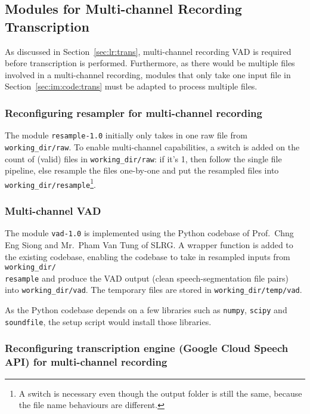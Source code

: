 \subsection{Modules for Multi-channel Recording
Transcription}\label{sec:im:code:mctr}

As discussed in Section~\ref{sec:lr:trans}, multi-channel recording VAD
is required before transcription is performed. Furthermore, as there would
be multiple files involved in a multi-channel recording, modules that only
take one input file in Section~\ref{sec:im:code:trans} must be adapted to
process multiple files.

\subsubsection{Reconfiguring resampler for multi-channel recording}

The module \texttt{resample-1.0} initially only takes in one raw file from
\texttt{working\_dir/raw}. To enable multi-channel capabilities, a switch is
added on the count of (valid) files in \texttt{working\_dir/raw}: if it's 1,
then follow the single file pipeline, else resample the files one-by-one and
put the resampled files into \texttt{working\_dir/resample}\footnote{A
switch is necessary even though the output folder is still the same, because
the file name behaviours are different.}.

\subsubsection{Multi-channel VAD}

The module \texttt{vad-1.0} is implemented using the Python codebase of
Prof.\ Chng Eng Siong and Mr.\ Pham Van Tung of SLRG\@. A wrapper function
is added to the existing codebase, enabling the codebase to take in resampled
inputs from \texttt{working\_dir/\\resample} and produce the VAD output
(clean speech-segmentation file pairs) into \texttt{working\_dir/vad}.
The temporary files are stored in \texttt{working\_dir/temp/vad}.

As the Python codebase depends on a few libraries such as \texttt{numpy},
\texttt{scipy} and \texttt{soundfile}, the setup script would install
those libraries.

\subsubsection{Reconfiguring transcription engine (Google Cloud Speech API)
for multi-channel recording}

